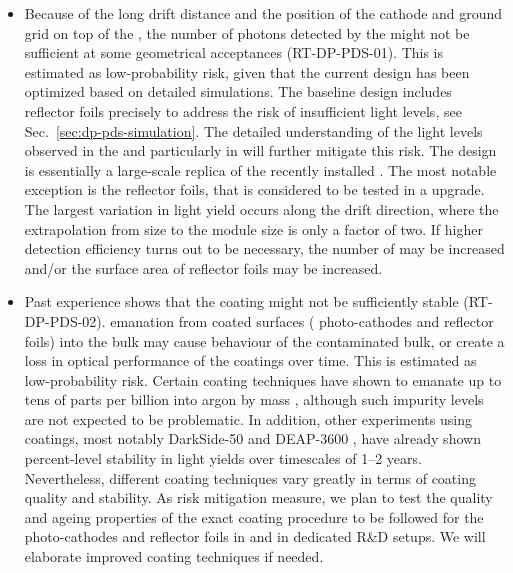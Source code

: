 \begin{itemize}

\item Because of the long drift distance and the position of the cathode and ground grid on top of the , the number of photons detected by the  might not be sufficient at some geometrical acceptances (RT-DP-PDS-01). This is estimated as low-probability risk, given that the current  design has been optimized based on detailed simulations. The  baseline design includes  reflector foils precisely to address the risk of insufficient light levels, see Sec.~\ref{sec:dp-pds-simulation}. The detailed understanding of the light levels observed in the  and particularly in  will further mitigate this risk. The \dune {}  design is essentially a large-scale replica of the recently installed  . The most notable exception is the  reflector foils, that is considered to be tested in a   upgrade. The largest variation in light yield occurs along the drift direction, where the extrapolation from  size to the \dune {} module size is only a factor of two. If higher  detection efficiency turns out to be necessary, the number of  may be increased and/or the surface area of  reflector foils may be increased.

\item Past experience shows that the  coating might not be sufficiently stable (RT-DP-PDS-02).  emanation from coated surfaces ( photo-cathodes and  reflector foils) into the bulk  may cause  behaviour of the contaminated  bulk, or create a loss in optical performance of the coatings over time. This is estimated as low-probability risk. Certain coating techniques have shown to emanate  up to tens of parts per billion into argon by mass \cite{Asaadi:2018ixs}, although such impurity levels are not expected to be problematic. In addition, other  experiments using  coatings, most notably DarkSide-50 \cite{Agnes:2018fwg} and DEAP-3600 \cite{Ajaj:2019imk}, have already shown percent-level stability in  light yields over timescales of 1--2 years. Nevertheless, different coating techniques vary greatly in terms of coating quality and stability. As risk mitigation measure, we plan to test the quality and ageing properties of the exact coating procedure to be followed for the  photo-cathodes and  reflector foils in  and in dedicated R\&D setups. We will elaborate improved coating techniques if needed.


\end{itemize}
